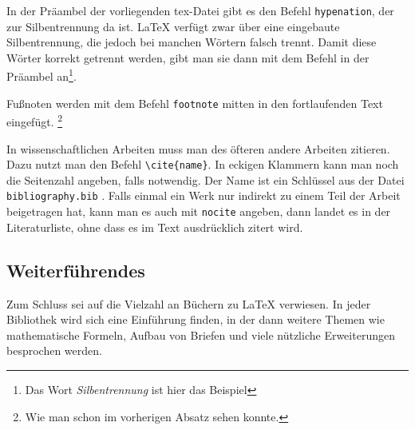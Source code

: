 In der Präambel der vorliegenden tex-Datei gibt es den Befehl \verb|hypenation|, der zur Silbentrennung da ist. \LaTeX{} verfügt zwar über  eine eingebaute Silbentrennung, die jedoch bei manchen Wörtern falsch trennt. Damit diese Wörter korrekt getrennt werden, gibt man sie dann mit dem Befehl in der Präambel an\footnote{Das Wort \emph{Silbentrennung} ist hier das Beispiel}.

Fußnoten werden mit dem Befehl \verb|footnote| mitten in den fortlaufenden Text eingefügt. \footnote{Wie man schon im vorherigen Absatz sehen konnte.}

In wissenschaftlichen Arbeiten muss man des öfteren andere Arbeiten zitieren. Dazu nutzt man den Befehl \verb|\cite{name}|. In eckigen Klammern kann man noch die Seitenzahl angeben, falls notwendig. Der Name ist ein Schlüssel aus der Datei \verb|bibliography.bib| \cite[S.~10]{kopka}. Falls einmal ein Werk nur indirekt zu einem Teil der Arbeit beigetragen hat, kann man es auch mit \verb|nocite| angeben, dann landet es in der Literaturliste, ohne dass es im Text ausdrücklich zitert wird.


\subsection{Weiterführendes}

Zum Schluss sei auf die Vielzahl an Büchern zu \LaTeX{} verwiesen. In jeder Bibliothek wird sich eine Einführung finden, in der dann weitere Themen wie mathematische Formeln, Aufbau von Briefen und viele nützliche Erweiterungen besprochen werden.


